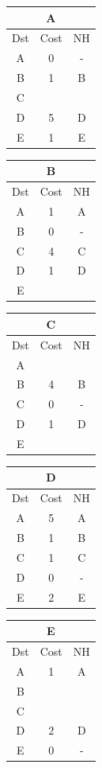\documentclass[10pt]{article}
\begin{document}
	\begin{table}[h!]
		\begin{tabular}{|c||c||c|}
 			\hline
	 		\multicolumn{3}{|c|}{A} \\
 			\hline
 			Dst & Cost & NH\\
 			\hline
 			A & 0 & - \\
 			B & 1 & B \\
 			C &   &   \\
 			D & 5 & D \\
 			E & 1 & E \\
 			\hline
		\end{tabular}
		\begin{tabular}{|c||c||c|}
 			\hline
	 		\multicolumn{3}{|c|}{B} \\
 			\hline
 			Dst & Cost & NH\\
 			\hline
 			A & 1 & A \\
 			B & 0 & - \\
 			C & 4 & C  \\
 			D & 1 & D \\
 			E &   &   \\
 			\hline
		\end{tabular}
		\begin{tabular}{|c||c||c|}
 			\hline
	 		\multicolumn{3}{|c|}{C} \\
 			\hline
 			Dst & Cost & NH\\
 			\hline
 			A &   &   \\
 			B & 4 & B \\
 			C & 0 & - \\
 			D & 1 & D \\
 			E &   &   \\
 			\hline
		\end{tabular}
		\begin{tabular}{|c||c||c|}
 			\hline
	 		\multicolumn{3}{|c|}{D} \\
 			\hline
 			Dst & Cost & NH\\
 			\hline
 			A & 5 & A \\
 			B & 1 & B \\
 			C & 1 & C \\
 			D & 0 & - \\
 			E & 2 & E \\
 			\hline
		\end{tabular}
		\begin{tabular}{|c||c||c|}
 			\hline
	 		\multicolumn{3}{|c|}{E} \\
 			\hline
 			Dst & Cost & NH\\
 			\hline
 			A & 1 & A \\
 			B &   &   \\
 			C &   &   \\
 			D & 2 & D \\
 			E & 0 & - \\
 			\hline
		\end{tabular}
	\end{table}
\end{document}
